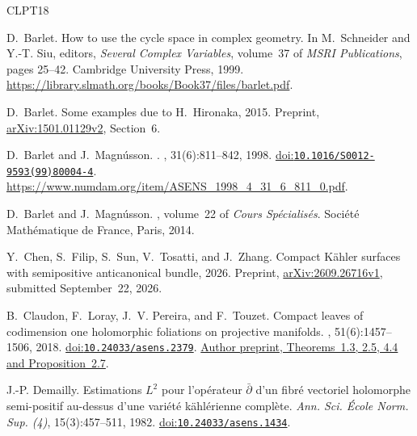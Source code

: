 \documentclass[11pt]{amsart}
\theoremstyle{definition}
\theoremstyle{remark}
\numberwithin{equation}{section}
\newcommand{\barp}{\bar\partial}
\begin{document}
\newcommand{\etalchar}[1]{$^{#1}$}
\begin{thebibliography}{CLPT18}

D.~Barlet.
\newblock How to use the cycle space in complex geometry.
\newblock In M.~Schneider and Y.-T. Siu, editors, {\em Several Complex Variables}, volume~37 of {\em MSRI Publications}, pages 25--42. Cambridge University Press, 1999.
\newblock \url{https://library.slmath.org/books/Book37/files/barlet.pdf}.

D.~Barlet.
\newblock Some examples due to {H.~Hironaka}, 2015.
\newblock Preprint, \href{https://arxiv.org/abs/1501.01129}{arXiv:1501.01129v2}, Section~6.

D.~Barlet and J.~Magn\'usson.
.
, 31(6):811--842, 1998.
\newblock \href{https://doi.org/10.1016/S0012-9593(99)80004-4}{doi:\nolinkurl{10.1016/S0012-9593(99)80004-4}}. \url{https://www.numdam.org/item/ASENS_1998_4_31_6_811_0.pdf}.

D.~Barlet and J.~Magn\'usson.
, volume~22 of {\em Cours Sp\'ecialis\'es}.
\newblock Soci\'et\'e Math\'ematique de France, Paris, 2014.

\bibitem[CFS{\etalchar{+}}26]{CFSTZ2026}
Y.~Chen, S.~Filip, S.~Sun, V.~Tosatti, and J.~Zhang.
\newblock Compact {K\"ahler} surfaces with semipositive anticanonical bundle, 2026.
\newblock Preprint, \href{https://arxiv.org/abs/2609.26716v1}{arXiv:2609.26716v1}, submitted September~22, 2026.

B.~Claudon, F.~Loray, J.~V. Pereira, and F.~Touzet.
\newblock Compact leaves of codimension one holomorphic foliations on projective manifolds.
, 51(6):1457--1506, 2018.
\newblock \href{https://doi.org/10.24033/asens.2379}{doi:\nolinkurl{10.24033/asens.2379}}. \href{https://arxiv.org/abs/1512.06623}{Author preprint, Theorems~1.3, 2.5, 4.4 and Proposition~2.7}.

J.-P. Demailly.
\newblock Estimations $L^2$ pour l'op\'erateur $\barp$ d'un fibr\'e
vectoriel holomorphe semi-positif au-dessus d'une vari\'et\'e
k\"ahl\'erienne compl\`ete.
\newblock \emph{Ann. Sci. \'Ecole Norm. Sup. (4)}, 15(3):457--511, 1982.
\newblock \href{https://doi.org/10.24033/asens.1434}{doi:\nolinkurl{10.24033/asens.1434}}.


\end{thebibliography}
\end{document}
